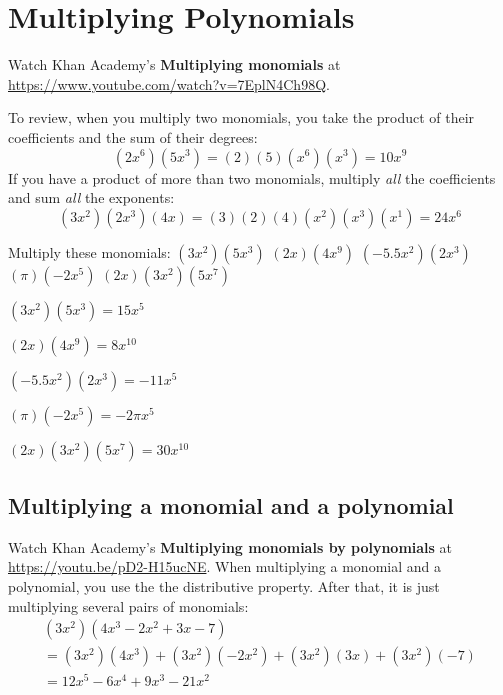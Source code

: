 \chapter{Multiplying Polynomials}

Watch Khan Academy's \textbf{Multiplying monomials} at \url{https://www.youtube.com/watch?v=7EplN4Ch98Q}.

To review, when you multiply two monomials, you take the product of
their coefficients and the sum of their degrees:
\begin{equation*}
  (2x^6)(5x^3) = (2)(5)(x^6)(x^3) = 10x^9
\end{equation*}
If you have a product of more than two monomials, multiply \emph{all}
the coefficients and sum \emph{all} the exponents:
\begin{equation*}
  (3x^2)(2x^3)(4x) = (3)(2)(4)(x^2)(x^3)(x^1) = 24x^6
\end{equation*}

\begin{Exercise}[title={Multiplying monomials}, label=multmonomials]
Multiply these monomials:
  \Question $(3x^2)(5x^3)$
\vspace{20mm}
  \Question $(2x)(4x^9)$
\vspace{20mm}
  \Question $(-5.5x^2)(2x^3)$
\vspace{20mm}
  \Question $(\pi)(-2x^5)$
\vspace{20mm}
  \Question $(2x)(3x^2)(5x^7)$
\vspace{20mm}
\end{Exercise}
\begin{Answer}[ref=multmonomials]
  $(3x^2)(5x^3) = 15x^5$
  
  $(2x)(4x^9) = 8x^{10}$
  
  $(-5.5x^2)(2x^3) = -11x^5$

  $(\pi)(-2x^5) = -2\pi x^5$
  
  $(2x)(3x^2)(5x^7) = 30x^{10}$
\end{Answer}

\section{Multiplying a monomial and a polynomial}

Watch Khan Academy's \textbf{Multiplying monomials by polynomials} at \url{https://youtu.be/pD2-H15ucNE}.
When multiplying a monomial and a polynomial, you use the the distributive property. After that, it is just multiplying several pairs of monomials:
\begin{multline*}
  (3x^2)(4x^3 - 2x^2 + 3x - 7) \\
  = (3x^2)(4x^3) + (3x^2)(-2x^2) + (3x^2)(3x) + (3x^2)(-7) \\
  = 12x^5 - 6x^4 + 9x^3 -21x^2
\end{multline*}

